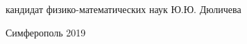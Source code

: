 \begin{titlepage}
    кандидат физико-математических наук \hspace*{1cm} Ю.Ю. Дюличева
    
    
    
    
    \vspace{\fill}

    \begin{center}
    Симферополь 2019
    \end{center}

    \end{titlepage}